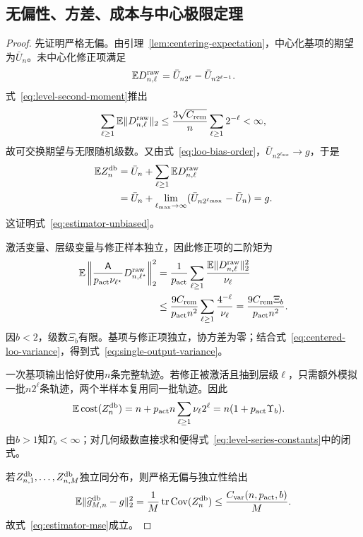 \subsection{无偏性、方差、成本与中心极限定理}

\begin{proof}
先证明严格无偏。由引理~\ref{lem:centering-expectation}，中心化基项的期望为$\bar U_n$。未中心化修正项满足
\begin{equation}\label{eq:delta-mean}
 \mathbb E D_{n,\ell}^{\rm raw}
 =\bar U_{n2^\ell}-\bar U_{n2^{\ell-1}}.
\end{equation}
式~\eqref{eq:level-second-moment}推出
\[
 \sum_{\ell\ge1}\mathbb E\lVert D_{n,\ell}^{\rm raw}\rVert_2
 \le\frac{3\sqrt{C_{\rm rem}}}{n}\sum_{\ell\ge1}2^{-\ell}<\infty,
\]
故可交换期望与无限随机级数。又由式~\eqref{eq:loo-bias-order}，$\bar U_{n2^{\ell_{\max}}}\to g$，于是
\begin{align*}
 \mathbb E Z_n^{\mathrm{db}}
 &=\bar U_n+\sum_{\ell\ge1}\mathbb E D_{n,\ell}^{\rm raw}\\
 &=\bar U_n+\lim_{\ell_{\max}\to\infty}
 (\bar U_{n2^{\ell_{\max}}}-\bar U_n)
 =g.
\end{align*}
这证明式~\eqref{eq:estimator-unbiased}。

激活变量、层级变量与修正样本独立，因此修正项的二阶矩为
\begin{align*}
 \mathbb E\left\|\frac{\mathsf A}{p_{\rm act}\nu_{\ell^\star}}D_{n,\ell^\star}^{\rm raw}\right\|_2^2
 &=\frac{1}{p_{\rm act}}\sum_{\ell\ge1}
 \frac{\mathbb E\lVert D_{n,\ell}^{\rm raw}\rVert_2^2}{\nu_\ell}\\
 &\le\frac{9C_{\rm rem}}{p_{\rm act} n^2}
 \sum_{\ell\ge1}\frac{4^{-\ell}}{\nu_\ell}
 =\frac{9C_{\rm rem}\Xi_b}{p_{\rm act} n^2}.
\end{align*}
因$b<2$，级数$\Xi_b$有限。基项与修正项独立，协方差为零；结合式~\eqref{eq:centered-loo-variance}，得到式~\eqref{eq:single-output-variance}。

一次基项输出恰好使用$n$条完整轨迹。若修正被激活且抽到层级$\ell$，只需额外模拟一批$n2^\ell$条轨迹，两个半样本复用同一批轨迹。因此
\begin{align*}
 \mathbb E\operatorname{cost}(Z_n^{\mathrm{db}})
 &=n+p_{\rm act} n\sum_{\ell\ge1}\nu_\ell2^\ell
 =n(1+p_{\rm act} \Upsilon_b).
\end{align*}
由$b>1$知$\Upsilon_b<\infty$；对几何级数直接求和便得式~\eqref{eq:level-series-constants}中的闭式。

若$Z_{n,1}^{\mathrm{db}},\ldots,Z_{n,M}^{\mathrm{db}}$独立同分布，则严格无偏与独立性给出
\[
 \mathbb E\lVert\widehat g_{M,n}^{\mathrm{db}}-g\rVert_2^2
 =\frac1M\operatorname{tr}\operatorname{Cov}(Z_n^{\mathrm{db}})
 \le\frac{C_{\rm var}(n,p_{\rm act},b)}{M}.
\]
故式~\eqref{eq:estimator-mse}成立。
\end{proof}

